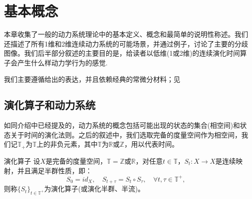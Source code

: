 \chapter{基本概念}

本章收集了一般的动力系统理论中的基本定义、概念和最简单的说明性称述。我们还描述了所有1维和2维连续动力系统的可能场景，并通过例子，讨论了主要的分歧图像。我们后半部分叙述的主要目的是，给读者以低维(1或2维)的连续演化时间算子会产生什么样动力学行为的感觉.

我们主要遵循给出的表达，并且依赖经典的常微分材料；见\cite{Nemytskii60}

\section{演化算子和动力系统}
如同介绍中已经提及的，动力系统的概念包括可能出现的状态的集合(相空间)和状态关于时间的演化法则。之后的叙述中，我们选取完备的度量空间作为相空间，我们记$\mathbb{T}_{+}$为$\mathbb{T}$上的非负元素，其中$\mathbb{T}$为$\mathbb{R}$或$\mathbb{Z}$，用以代表时间。
\begin{defination}{演化算子}{}
	设$X$是完备的度量空间，$\mathbb{T}=\mathbb{Z}$或$\mathbb{R}$，对任意$t\in\mathbb{T}$，$S_{t}:X\to X$是连续映射，并且满足半群性质，即：$$S_{0}=id_{X},\quad S_{t+\tau}=S_{t}\circ S_{\tau},\quad\forall t,\tau\in\mathbb{T}^{+},$$则称$\{S_{t}\}_{t\in \mathbb{T}^{+}}$为演化算子(或演化半群、半流)。
\end{defination}